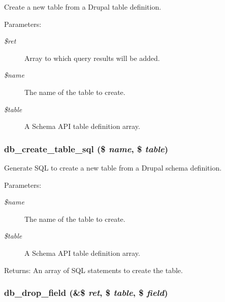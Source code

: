 Create a new table from a Drupal table definition.

\begin{Desc}
\item[Parameters:]
\begin{description}
\item[{\em \$ret}]Array to which query results will be added. \item[{\em \$name}]The name of the table to create. \item[{\em \$table}]A Schema API table definition array. \end{description}
\end{Desc}
\hypertarget{group__schemaapi_gd567c41b41c4d48ed50af9b878c8ecaf}{
\subsubsection[{db\_\-create\_\-table\_\-sql}]{\setlength{\rightskip}{0pt plus 5cm}db\_\-create\_\-table\_\-sql (\$ {\em name}, \/  \$ {\em table})}}
\label{group__schemaapi_gd567c41b41c4d48ed50af9b878c8ecaf}


Generate SQL to create a new table from a Drupal schema definition.

\begin{Desc}
\item[Parameters:]
\begin{description}
\item[{\em \$name}]The name of the table to create. \item[{\em \$table}]A Schema API table definition array. \end{description}
\end{Desc}
\begin{Desc}
\item[Returns:]An array of SQL statements to create the table. \end{Desc}
\hypertarget{group__schemaapi_ge2013b878edbcfe21ca123e73af4684a}{
\subsubsection[{db\_\-drop\_\-field}]{\setlength{\rightskip}{0pt plus 5cm}db\_\-drop\_\-field (\&\$ {\em ret}, \/  \$ {\em table}, \/  \$ {\em field})}}
\label{group__schemaapi_ge2013b878edbcfe21ca123e73af4684a}


